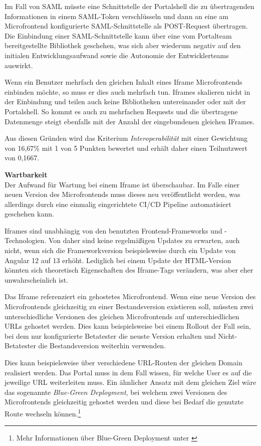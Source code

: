 Im Fall von \gls{SAML} müsste eine Schnittstelle der Portalshell die zu übertragenden Informationen in einem \gls{SAML}-Token verschlüsseln und dann an eine am Microfrontend konfigurierte \gls{SAML}-Schnittstelle als POST-Request übertragen. Die Einbindung einer \gls{SAML}-Schnittstelle kann über eine vom Portalteam bereitgestellte Bibliothek geschehen, was sich aber wiederum negativ auf den initialen Entwicklungsaufwand sowie die Autonomie der Entwicklerteams auswirkt.

Wenn ein Benutzer mehrfach den gleichen Inhalt eines Iframe Microfrontends einbinden möchte, so muss er dies auch mehrfach tun. Iframes skalieren nicht in der Einbindung und teilen auch keine Bibliotheken untereinander oder mit der Portalshell. So kommt es auch zu mehrfachen Requests und die übertragene Datenmenge steigt ebenfalls mit der Anzahl der eingebundenen gleichen IFrames.

Aus diesen Gründen wird das Kriterium \textit{Interoperabilität} mit einer Gewichtung von 16,67\% mit 1 von 5 Punkten bewertet und erhält daher einen Teilnutzwert von 0,1667.

\textbf{Wartbarkeit}\\
Der Aufwand für Wartung bei einem Iframe ist überschaubar. Im Falle einer neuen Version des Microfrontends muss dieses neu veröffentlicht werden, was allerdings durch eine einmalig eingerichtete \gls{CI/CD} Pipeline automatisiert geschehen kann. 

Iframes sind unabhängig von den benutzten Frontend-Frameworks und -Technologien. Von daher sind keine regelmäßigen Updates zu erwarten, auch nicht, wenn sich die Frameworkversion beispielsweise durch ein Update von Angular 12 auf 13 erhöht. Lediglich bei einem Update der \gls{HTML}-Version könnten sich theoretisch Eigenschaften des Iframe-Tags verändern, was aber eher unwahrscheinlich ist.

Das Iframe referenziert ein gehostetes Microfrontend. Wenn eine neue Version des Microfrontends gleichzeitig zu einer Bestandsversion existieren soll, müssten zwei unterschiedliche Versionen des gleichen Microfrontends auf unterschiedlichen URLs gehostet werden. Dies kann beispielsweise bei einem Rollout der Fall sein, bei dem nur konfigurierte Betatester die neuste Version erhalten und Nicht-Betatester die Bestandsversion weiterhin verwenden. 

Dies kann beispielsweise über verschiedene URL-Routen der gleichen Domain realisiert werden. Das Portal muss in dem Fall wissen, für welche User es auf die jeweilige \gls{URL} weiterleiten muss. Ein ähnlicher Ansatz mit dem gleichen Ziel wäre das sogenannte \textit{Blue-Green Deployment}, bei welchem zwei Versionen des Microfrontends gleichzeitig gehostet werden und diese bei Bedarf die genutzte Route wechseln können.\footnote{Mehr Informationen über Blue-Green Deployment unter \cite[][]{CloudFoundryDocumentation2020}}

